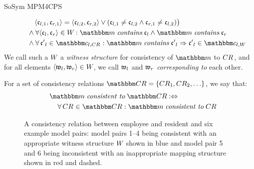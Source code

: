 \begin{copiedFrom}{SoSym MPM4CPS}
\begin{definition}[Consistency]
\begin{align*}
        & \formulaskip\formulaskip\formulaskip
        \tupled{\conditionelement{c}{l,1}, \conditionelement{c}{r,1}} = \tupled{\conditionelement{c}{l,2}, \conditionelement{c}{r,2}} \lor 
        ( \conditionelement{c}{l,1} \neq \conditionelement{c}{l,2} \land \conditionelement{c}{r,1} \neq \conditionelement{c}{l,2}) \bigr) \\
        & \formulaskip\formulaskip
        \land \forall \tupled{\conditionelement{c}{l}, \conditionelement{c}{r}} \in  \consistencyrelation{W}{} : \modelset{m} \containsmath \conditionelement{c}{l} \land \modelset{m} \containsmath \conditionelement{c}{r} \\
        & \formulaskip\formulaskip
        \land \forall \conditionelement{c'}{l} \in \condition{c}{l,\consistencyrelation{CR}{}} : \modelset{m} \containsmath \conditionelement{c'}{l} \Rightarrow \conditionelement{c'}{l} \in \condition{c}{l,\consistencyrelation{W}{}}
    \end{align*}
    We call such a $W_{}$ a \emph{witness structure} for consistency of $\modelset{m}$ to $CR_{}$, and for all elements $\langle \mathfrak{w}_{l}, \mathfrak{w}_{r} \rangle \in W_{}$, we call $\mathfrak{w}_{l}$ and $\mathfrak{w}_{r}$ \emph{corresponding to} each other.
    
    For a set of consistency relations $\consistencyrelationset{CR} = \setted{\consistencyrelation{CR}{1}, \consistencyrelation{CR}{2}, \dots}$, we say that:
    \begin{align*}
        \formulaskip &
        \modelset{m} \mathtext{consistent to} \consistencyrelationset{CR} \equivalentperdefinition \\
        & \formulaskip
        \forall \consistencyrelation{CR}{} \in \consistencyrelationset{CR} : \modelset{m} \mathtext{consistent to} \consistencyrelation{CR}{}
    \end{align*}
\end{definition}

\begin{figure}
    \centering
    
    \caption{A consistency relation between employee and resident and six example model pairs: model pairs 1--4 being consistent with an appropriate witness structure $W_{}$ shown in blue and model pair 5 and 6 being inconsistent with an inappropriate mapping structure shown in red and dashed.}
    \label{fig:correctness:formal:consistency_example}
\end{figure}


\end{copiedFrom}
